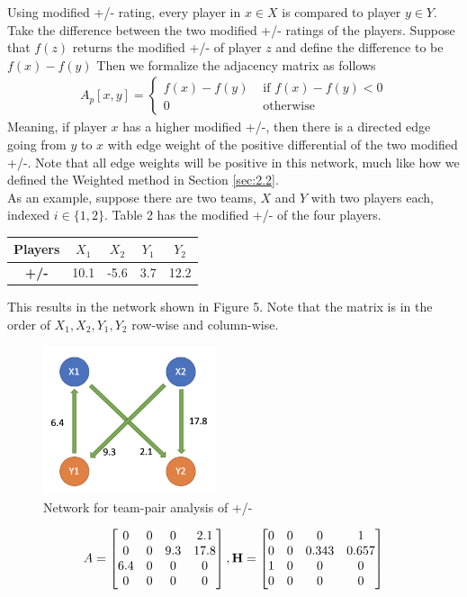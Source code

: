 \documentclass[12pt]{article}%
\begin{document}
\null\quad\quad Using modified +/- rating, every player in $x\in X$ is compared to player $y\in Y$. Take the difference between the two modified +/- ratings of the players. Suppose that $f(z)$ returns the modified +/- of player $z$ and define the difference to be $f(x)-f(y)$ Then we formalize the adjacency matrix as follows
\begin{align*}
A_p[x,y]=\begin{cases}
f(x)-f(y)&\text{ if }f(x)-f(y)<0\\
0 &\text{ otherwise}
\end{cases}
\end{align*}
Meaning, if player $x$ has a higher modified +/-, then there is a directed edge going from $y$ to $x$ with edge weight of the positive differential of the two modified +/-. Note that all edge weights will be positive in this network, much like how we defined the Weighted method in Section \ref{sec:2.2}.\\
\null\quad\quad As an example, suppose there are two teams, $X$ and $Y$ with two players each, indexed $i\in\{1,2\}$. Table 2 has the modified +/- of the four players.
\begin{center}
\begin{tabular}{|c|c c c c|}
\hline
\textbf{Players} & $X_1$ & $X_2$ & $Y_1$ & $Y_2$\\
\hline
\textbf{+/-} & 10.1 & -5.6 & 3.7 & 12.2 \\
\hline
\end{tabular}
\end{center}
This results in the network shown in Figure 5. Note that the matrix is in the order of $X_1,X_2,Y_1,Y_2$ row-wise and column-wise.
  \begin{figure}[H]
	\centering
	\includegraphics[width=2in]{./images/team.png}
	\caption[Network for team-pair analysis of +/-]{Network for team-pair analysis of +/-}
\end{figure}
\begin{align*}
A =\begin{bmatrix}0 & 0 & 0 & 2.1 \\0 & 0 & 9.3 & 17.8\\ 6.4 &0&0&0\\0&0&0&0\end{bmatrix}, \textbf H=\begin{bmatrix}0 & 0 & 0 & 1 \\0 & 0 & 0.343 & 0.657\\ 1 &0&0&0\\0&0&0&0\end{bmatrix}
\end{align*}
\end{document}

